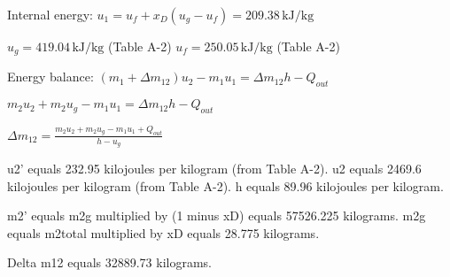 Internal energy:  
\( u_1 = u_f + x_D (u_g - u_f) = 209.38 \, \text{kJ/kg} \)  

\( u_g = 419.04 \, \text{kJ/kg} \) (Table A-2)  
\( u_f = 250.05 \, \text{kJ/kg} \) (Table A-2)  

Energy balance:  
\( (m_1 + \Delta m_{12}) u_2 - m_1 u_1 = \Delta m_{12} h - Q_{out} \)  

\( m_2 u_2 + m_2 u_g - m_1 u_1 = \Delta m_{12} h - Q_{out} \)  

\( \Delta m_{12} = \frac{m_2 u_2 + m_2 u_g - m_1 u_1 + Q_{out}}{h - u_g} \)

u2' equals 232.95 kilojoules per kilogram (from Table A-2).  
u2 equals 2469.6 kilojoules per kilogram (from Table A-2).  
h equals 89.96 kilojoules per kilogram.  

m2' equals m2g multiplied by (1 minus xD) equals 57526.225 kilograms.  
m2g equals m2total multiplied by xD equals 28.775 kilograms.  

Delta m12 equals 32889.73 kilograms.